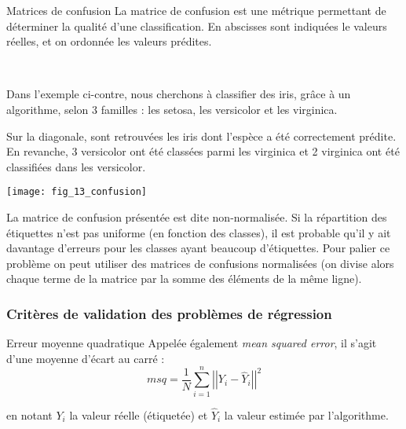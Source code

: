 \begin{defi}{Matrices de confusion}
La matrice de confusion est une métrique permettant de déterminer la qualité d'une classification. En abscisses sont indiquées le valeurs réelles, et on ordonnée les valeurs prédites. 
\end{defi}
\begin{exemple}~\\

\begin{minipage}[c]{.6\linewidth}
Dans l'exemple ci-contre, nous cherchons à classifier des iris, grâce à un algorithme, selon 3 familles : les setosa, les versicolor et les virginica. 

Sur la diagonale, sont retrouvées les iris dont l'espèce a été correctement prédite. En revanche, 3 versicolor ont été classées parmi les virginica et 2 virginica ont été classifiées dans les versicolor. 

\end{minipage} \hfill
\begin{minipage}[c]{.35\linewidth}
\begin{center}
\texttt{[image: fig\_13\_confusion]}
\end{center}
\end{minipage} 

\end{exemple}

\begin{rem}
La matrice de confusion présentée est dite non-normalisée. Si la répartition des étiquettes n'est pas uniforme (en fonction des classes), il est probable qu'il y ait davantage d'erreurs pour les classes ayant beaucoup d'étiquettes. Pour palier ce problème on peut utiliser des matrices de confusions normalisées (on divise alors chaque terme de la matrice par la somme des éléments de la même ligne).
\end{rem}

\subsubsection{Critères de validation des problèmes de régression}
\begin{defi}{Erreur moyenne quadratique}
Appelée également \textit{mean squared error}, il s'agit d'une moyenne d'écart au carré : 
$$
msq = \dfrac{1}{N} \sum\limits_{i=1}^n \left|\left|Y_i - \hat{Y}_i \right|\right|^2
$$
 
 en notant $Y_i$ la valeur réelle (étiquetée) et $ \hat{Y}_i$ la valeur estimée par l'algorithme.
\end{defi}

